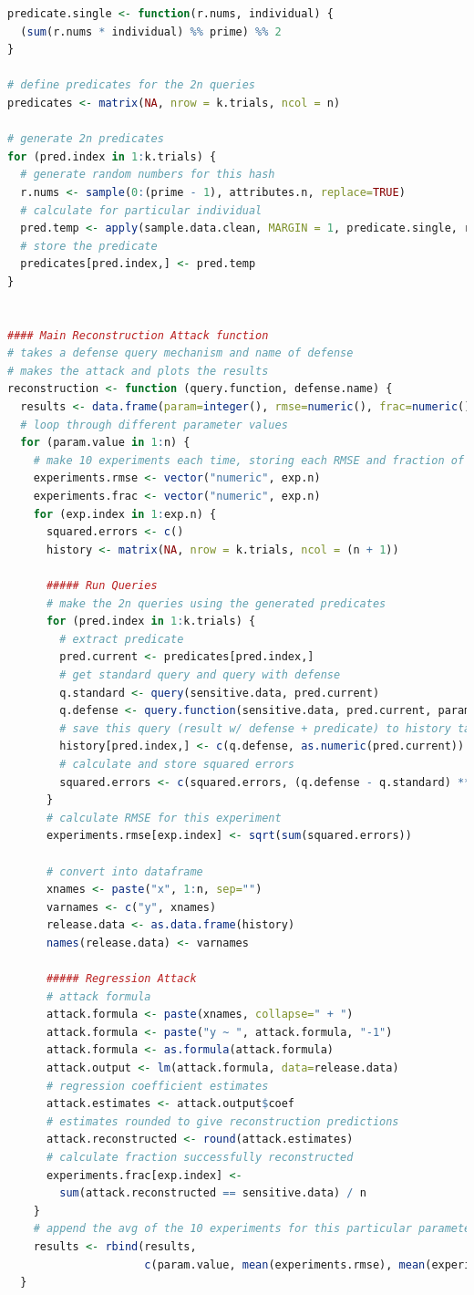 \documentclass[12pt]{article}
\begin{document}
\begin{lstlisting}[language=R]
predicate.single <- function(r.nums, individual) {
  (sum(r.nums * individual) %% prime) %% 2
}

# define predicates for the 2n queries
predicates <- matrix(NA, nrow = k.trials, ncol = n)

# generate 2n predicates
for (pred.index in 1:k.trials) {
  # generate random numbers for this hash
  r.nums <- sample(0:(prime - 1), attributes.n, replace=TRUE)
  # calculate for particular individual
  pred.temp <- apply(sample.data.clean, MARGIN = 1, predicate.single, r.nums)
  # store the predicate
  predicates[pred.index,] <- pred.temp
}


#### Main Reconstruction Attack function
# takes a defense query mechanism and name of defense
# makes the attack and plots the results
reconstruction <- function (query.function, defense.name) {
  results <- data.frame(param=integer(), rmse=numeric(), frac=numeric())
  # loop through different parameter values
  for (param.value in 1:n) {
    # make 10 experiments each time, storing each RMSE and fraction of success
    experiments.rmse <- vector("numeric", exp.n)
    experiments.frac <- vector("numeric", exp.n)
    for (exp.index in 1:exp.n) {
      squared.errors <- c()
      history <- matrix(NA, nrow = k.trials, ncol = (n + 1))
      
      ##### Run Queries
      # make the 2n queries using the generated predicates
      for (pred.index in 1:k.trials) {
        # extract predicate
        pred.current <- predicates[pred.index,]
        # get standard query and query with defense
        q.standard <- query(sensitive.data, pred.current)
        q.defense <- query.function(sensitive.data, pred.current, param.value)
        # save this query (result w/ defense + predicate) to history table
        history[pred.index,] <- c(q.defense, as.numeric(pred.current))
        # calculate and store squared errors
        squared.errors <- c(squared.errors, (q.defense - q.standard) ** 2)
      }
      # calculate RMSE for this experiment
      experiments.rmse[exp.index] <- sqrt(sum(squared.errors))
      
      # convert into dataframe
      xnames <- paste("x", 1:n, sep="")
      varnames <- c("y", xnames)
      release.data <- as.data.frame(history)
      names(release.data) <- varnames
      
      ##### Regression Attack
      # attack formula
      attack.formula <- paste(xnames, collapse=" + ")
      attack.formula <- paste("y ~ ", attack.formula, "-1")
      attack.formula <- as.formula(attack.formula)
      attack.output <- lm(attack.formula, data=release.data)
      # regression coefficient estimates
      attack.estimates <- attack.output$coef
      # estimates rounded to give reconstruction predictions
      attack.reconstructed <- round(attack.estimates)
      # calculate fraction successfully reconstructed
      experiments.frac[exp.index] <-
        sum(attack.reconstructed == sensitive.data) / n
    }
    # append the avg of the 10 experiments for this particular parameter value
    results <- rbind(results,
                     c(param.value, mean(experiments.rmse), mean(experiments.frac)))
  }
  

\end{lstlisting}
\end{document}
